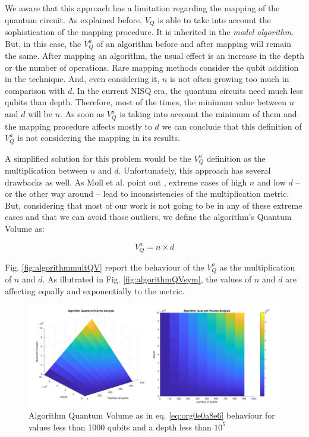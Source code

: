 \begin{enumerate}
\begin{enumerate}
\begin{enumerate}
We aware that this approach has a limitation regarding the mapping of the quantum circuit.
As explained before, \(V_Q\) is able to take into account the sophistication of the mapping procedure.
It is inherited in the \emph{model algorithm}.
But, in this case, the \(V^a_Q\) of an algorithm before and after mapping will remain the same.
After mapping an algorithm, the usual effect is an increase in the depth or the number of operations.
Rare mapping methods consider the qubit addition in the technique.
And, even considering it, \(n\) is not often growing too much in comparison with \(d\).
In the current NISQ era, the quantum circuits need much less qubits than depth.
Therefore, most of the times, the minimum value between \(n\) and \(d\) will be \(n\).
As soon as \(V^a_Q\) is taking into account the minimum of them and the mapping procedure affects mostly to \(d\) we can conclude that this definition of \(V^a_Q\) is not considering the mapping in its results.

A simplified solution for this problem would be the \(V^a_Q\) definition as the multiplication between \(n\) and \(d\).
Unfortunately, this approach has several drawbacks as well.
As Moll et al. point out \cite{Moll_2018}, extreme cases of high \(n\) and low \(d\) -- or the other way around -- lead to inconsistencies of the multiplication metric.
But, considering that most of our work is not going to be in any of these extreme cases and that we can avoid those outliers, we define the algorithm's Quantum Volume as:

\begin{equation}
\label{eq:org0e0a8e6}
V_Q^a =  n \times d
\end{equation}

Fig. \ref{fig:algorithmmultQV} report the behaviour of the \(V_Q^a\) as
the multiplication of \(n\) and \(d\).
As illutrated in Fig. \ref{fig:algorithmQVsym}, the values of \(n\) and \(d\) are
affecting equally and exponentially to the metric.

\begin{figure}[htbp]
\centering
\includegraphics[width=\textwidth]{figures/V_q_analysis_mult.png}
\caption{\label{fig:orgfbb64fd}
Algorithm Quantum Volume as in eq. \ref{eq:org0e0a8e6} behaviour for values less than 1000 qubits and a depth less than \(10^{5}\)}
\end{figure}


\end{enumerate}
\end{enumerate}
\end{enumerate}
